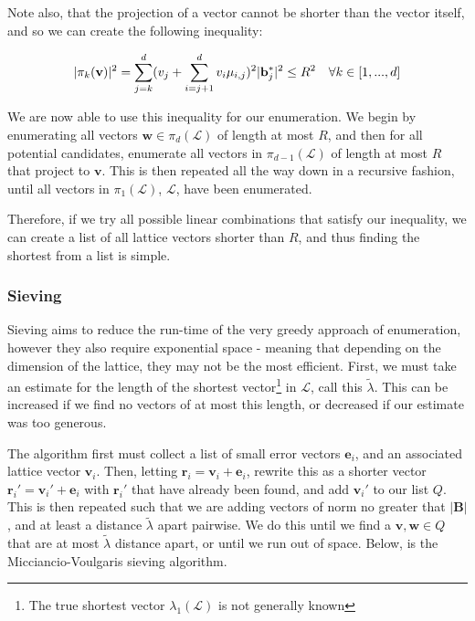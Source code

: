 \documentclass[a4paper, 10pt]{article}
\theoremstyle{definition}
\begin{document}
Note also, that the projection of a vector cannot be shorter than the vector itself, and so we can create the following inequality:

\[|\pi_k(\mathbf{v})|^2 = \sum_{j=k}^{d}(v_j + \sum_{i=j+1}^{d}v_i\mu_{i,j})^2|\mathbf{b}_j^*|^2\leq R^2 \mbox{\quad }\forall k\in\left[1,...,d\right]\]

We are now able to use this inequality for our enumeration. We begin by enumerating all vectors $\mathbf{w}\in \pi_d(\mathcal{L})$ of length at most $R$, and then for all potential candidates, enumerate all vectors in $\pi_{d-1}(\mathcal{L})$ of length at most $R$ that project to $\mathbf{v}$. This is then repeated all the way down in a recursive fashion, until all vectors in $\pi_1(\mathcal{L})$, $\mathcal{L}$, have been enumerated.

Therefore, if we try all possible linear combinations that satisfy our inequality, we can create a list of all lattice vectors shorter than $R$, and thus finding the shortest from a list is simple.

\subsubsection{Sieving}

Sieving aims to reduce the run-time of the very greedy approach of enumeration, however they also require exponential space - meaning that depending on the dimension of the lattice, they may not be the most efficient. First, we must take an estimate for the length of the  shortest vector\footnote{The true shortest vector $\lambda_1(\mathcal{L})$ is not generally known} in $\mathcal{L}$, call this $\tilde{\lambda}$. This can be increased if we find no vectors of at most this length, or decreased if our estimate was too generous.

The algorithm first must collect a list of small error vectors $\mathbf{e}_i$, and an associated lattice vector $\mathbf{v}_i$. Then, letting $\mathbf{r}_i = \mathbf{v}_i + \mathbf{e}_i$, rewrite this as a shorter vector $\mathbf{r}_i' = \mathbf{v}_i' + \mathbf{e}_i$ with $\mathbf{r}_i'$ that have already been found, and add $\mathbf{v}_i'$ to our list $Q$. This is then repeated such that we are adding vectors of norm no greater that $|\mathbf{B}|$, and at least a distance $\tilde{\lambda}$ apart pairwise. We do this until we find a $\mathbf{v},\mathbf{w}\in Q$ that are at most $\tilde{\lambda}$ distance apart, or until we run out of space. Below, is the Micciancio-Voulgaris sieving algorithm.
\end{document}
